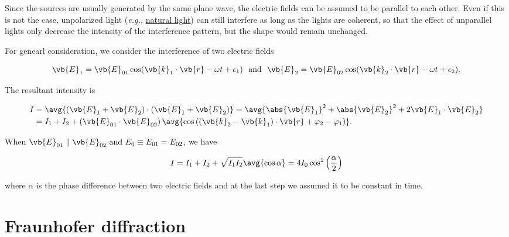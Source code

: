 \documentclass[english,a4paper,12pt]{report}
\begin{document}
Since the sources are usually generated by the same plane wave, the electric fields can be assumed to be parallel to each other. Even if this is not the case, unpolarized light (\textit{e.g.,} \href{https://www.youtube.com/watch?v=Iuv6hY6zsd0&t=326s}{natural light}) can still interfere as long as the lights are coherent, so that the effect of unparallel lights only decrease the intensity of the interference pattern, but the shape would remain unchanged.  

For genearl consideration, we consider the interference of two electric fields 

\begin{equation}
    \vb{E} _{1} = \vb{E} _{01} \cos (\vb{k}_{1}  \cdot \vb{r} - \omega t + \epsilon _{1} ) ~\text { and }~ \vb{E} _{2} = \vb{E} _{02} \cos (\vb{k}_{2}  \cdot \vb{r} - \omega t + \epsilon _{2} ).    
\end{equation}

The resultant intensity is 

\begin{equation}
    \begin{aligned} 
    I &= \avg{(\vb{E} _{1} + \vb{E} _{2}  ) \cdot (\vb{E} _{1} + \vb{E} _{2}  )} = \avg{\abs{\vb{E} _{1} }^2 + \abs{\vb{E} _{2} }^2 + 2 \vb{E} _{1} \cdot \vb{E} _{2}    } \\ &= I_1 + I_2 + \left( \vb{E} _{01} \cdot \vb{E} _{02}   \right) \avg{\cos \left( \left( \vb{k} _{2} - \vb{k} _{1}   \right) \cdot \vb{r} + \varphi _{2} - \varphi _{1}   \right)}.
    \end{aligned} 
\end{equation}

When \(\vb{E} _{01} \parallel \vb{E} _{02} \text { and } E_0  \equiv E_{01} = E_{02}    \), we have

\begin{equation}
    I = I_1 + I_2 + \sqrt{I_1 I_2 }  \avg{\cos \alpha} = 4I_0 \cos ^2 \left( \frac{\alpha }{2}  \right) 
\end{equation}

where \(\alpha \) is the phase difference between two electric fields and at the last step we assumed it to be constant in time.

\section{Fraunhofer diffraction}
\end{document}
